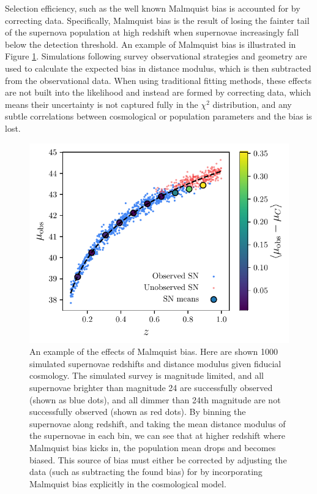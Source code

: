 \documentclass[a4paper,fleqn,usenatbib]{mnras}
\newcommand{\green}{\color{forestgreen}}
\begin{document}
Selection efficiency, such as the well known Malmquist bias \citep{MalmquistK.G.1922} is accounted for by correcting data. Specifically, Malmquist bias is the result of losing the fainter tail of the supernova population at high redshift when supernovae increasingly fall below the detection threshold. An example of Malmquist bias is illustrated in Figure \ref{fig:malmquist}. Simulations following survey observational strategies and geometry are used to calculate the expected bias in distance modulus, which is then {\green subtracted from} the observational data. When using traditional fitting methods, these effects are not built into the likelihood and instead are formed by correcting data, which means their uncertainty is not captured fully in the $\chi^2$ distribution, and any subtle correlations between cosmological or population parameters and the bias is lost.

\begin{figure}
	\begin{center}
		\includegraphics[width=\columnwidth]{malmquist.pdf}
	\end{center}
	\caption{An example of the effects of Malmquist bias. Here are shown 1000 simulated supernovae redshifts and distance modulus given fiducial cosmology. The simulated survey is magnitude limited, and all supernovae brighter than magnitude 24 are successfully observed (shown as blue dots), and all dimmer than 24th magnitude are not successfully observed (shown as red dots). By binning the supernovae along redshift, and taking the mean distance modulus of the supernovae in each bin, we can see that at higher redshift where Malmquist bias kicks in, the population mean drops and becomes biased. This source of bias must either be corrected by adjusting the data (such as subtracting the found bias) for by incorporating Malmquist bias explicitly in the cosmological model.}
	\label{fig:malmquist}
\end{figure}
\end{document}
